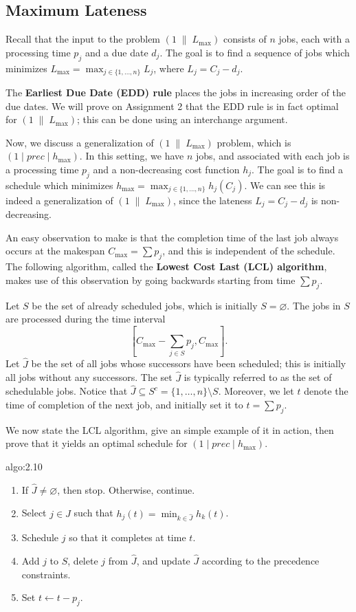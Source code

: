 \subsection{Maximum Lateness}\label{subsec:2.3}
Recall that the input to the problem $(1\;\|\;L_{\max})$ consists of 
$n$ jobs, each with a processing time $p_j$ and a due date $d_j$. 
The goal is to find a sequence of jobs which minimizes $L_{\max} = 
\max_{j\in\{1,\dots,n\}} L_j$, where $L_j = C_j - d_j$. 

The {\bf Earliest Due Date (EDD) rule} places the jobs in increasing order 
of the due dates. We will prove on Assignment 2 that the EDD rule is in fact 
optimal for $(1\;\|\;L_{\max})$; this can be done using an interchange argument.

Now, we discuss a generalization of $(1\;\|\;L_{\max})$ problem, which is 
$(1 \mid prec \mid h_{\max})$. In this setting, we have $n$ jobs, and 
associated with each job is a processing time $p_j$ and a non-decreasing 
cost function $h_j$. The goal is to find a schedule which minimizes 
$h_{\max} = \max_{j\in\{1,\dots,n\}} h_j(C_j)$. We can see this is indeed a 
generalization of $(1\;\|\;L_{\max})$, since the lateness $L_j = C_j - d_j$ 
is non-decreasing. 

An easy observation to make is that the completion time of the last job 
always occurs at the makespan $C_{\max} = \sum p_j$, and this is independent 
of the schedule. The following algorithm, called the {\bf Lowest Cost Last (LCL) algorithm}, makes 
use of this observation by going backwards starting from time $\sum p_j$. 

Let $S$ be the set of already scheduled jobs, which is initially $S = \varnothing$. 
The jobs in $S$ are processed during the time interval 
\[ \left[ C_{\max} - \sum_{j\in S} p_j, C_{\max} \right]. \] 
Let $\hat J$ be the set of all jobs whose successors have been 
scheduled; this is initially all jobs without any successors. 
The set $\hat J$ is typically referred to as the set of schedulable jobs.
Notice that $\hat J \subseteq S^c = \{1, \dots, n\} \setminus S$. Moreover, 
we let $t$ denote the time of completion of the next job, and initially 
set it to $t = \sum p_j$. 

We now state the LCL algorithm, give an simple example of it in action, then 
prove that it yields an optimal schedule for $(1 \mid prec \mid h_{\max})$. 

\begin{algo}{algo:2.10}
    \begin{enumerate}
        \item If $\hat J \neq \varnothing$, then stop. Otherwise, continue. 
        \item Select $j \in \hat J$ such that $h_j(t) = \min_{k\in\hat J} 
        h_k(t)$. 
        \item Schedule $j$ so that it completes at time $t$. 
        \item Add $j$ to $S$, delete $j$ from $\hat J$, and update $\hat J$
        according to the precedence constraints. 
        \item Set $t \gets t - p_j$. 
    \end{enumerate}
\end{algo} 

